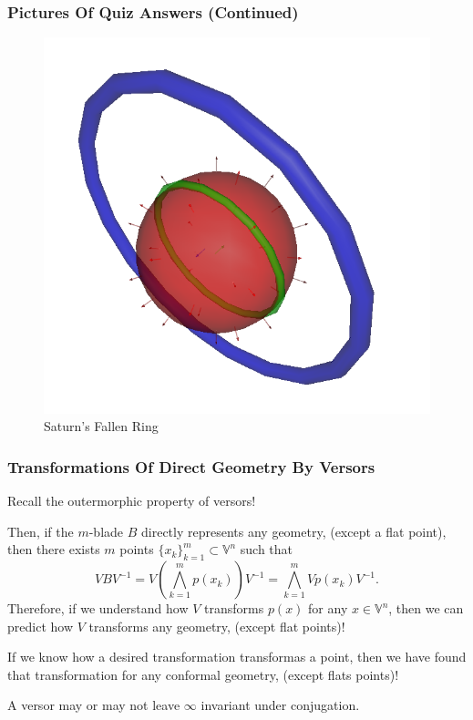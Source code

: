 \documentclass{beamer}
\newcommand{\V}{\mathbb{V}}
\newcommand{\nvai}{\infty}
\begin{document}
\begin{frame}
\frametitle{Pictures Of Quiz Answers (Continued)}
\begin{figure}
\centering
\includegraphics[scale=0.3]{FallenRingOfSaturn}
\caption{Saturn's Fallen Ring}
\end{figure}
\end{frame}

\begin{frame}
\frametitle{Transformations Of \alert{Direct} Geometry By Versors}
Recall the \alert{outermorphic} property of versors!\pause

Then, if the $m$-blade $B$ \alert{directly} represents
any geometry, (\alert{except a flat point}), then there exists $m$
points $\{x_k\}_{k=1}^m\subset\V^n$ such that
\begin{equation*}
VBV^{-1} = V\left(\bigwedge_{k=1}^m p(x_k)\right)V^{-1} = \bigwedge_{k=1}^m Vp(x_k)V^{-1}.
\end{equation*}\pause
Therefore, if we understand how $V$ transforms $p(x)$ for any $x\in\V^n$, then we can
predict how $V$ transforms any geometry, (\alert{except flat points})!\pause

If we know how a desired transformation transformas a point, then we have
found that transformation for any conformal geometry, (\alert{except flats points})!\pause

A versor may or may not leave $\nvai$ invariant under conjugation.
\end{frame}
\end{document}
